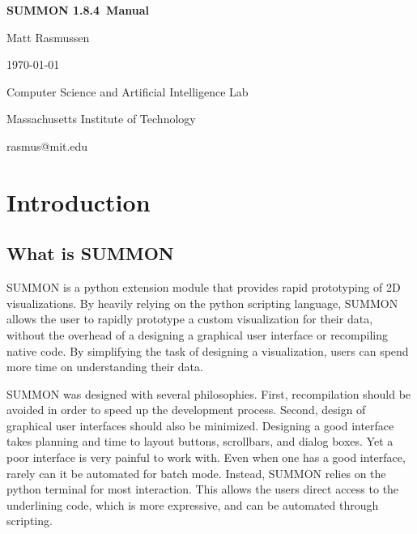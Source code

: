 \documentclass[12pt]{article}
\newcommand{\version}{1.8.4}
\begin{document}
\begin{titlepage}

\begin{center}

\vspace*{2.5in}

{\huge \bf {}\selectfont 
SUMMON \version\ Manual
}
\vspace*{.5in}

{\large
Matt Rasmussen

\today
}
\vspace*{.5in}

Computer Science and Artificial Intelligence Lab

Massachusetts Institute of Technology

\vspace*{.25in}

rasmus@mit.edu
\end{center}

\end{titlepage}


\tableofcontents

\clearpage

\section{Introduction}
\label{sec:intro}


\subsection{What is SUMMON}

SUMMON is a python extension module that provides rapid prototyping of 2D
visualizations.  By heavily relying on the python scripting language, SUMMON
allows the user to rapidly prototype a custom visualization for their data, 
without the overhead of a designing a graphical user interface or recompiling 
native code.  By simplifying the task of designing a visualization, users can 
spend more time on understanding their data. 

SUMMON was designed with several philosophies.  First, recompilation should
be avoided in order to speed up the development process.  Second, design of
graphical user interfaces should also be minimized.  Designing a good interface
takes planning and time to layout buttons, scrollbars, and dialog boxes.  Yet a 
poor interface is very painful to work with. Even when one has a good interface,
rarely can it be automated for batch mode.  Instead, SUMMON relies on the python
terminal for most interaction.  This allows the users direct access to  the
underlining code, which is more expressive, and can be automated through
scripting.  
\end{document}
